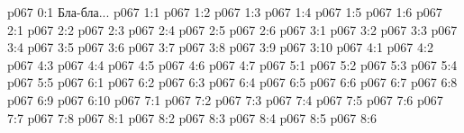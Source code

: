 \author{Мелхиседек}
\vs p067 0:1  Бла-бла...
\vs p067 1:1 
\vs p067 1:2 
\vs p067 1:3 
\vs p067 1:4 \pc 
\vs p067 1:5 
\vs p067 1:6 
\vs p067 2:1 
\vs p067 2:2 
\vs p067 2:3 \pc 
\vs p067 2:4 \pc 
\vs p067 2:5 
\vs p067 2:6 
\vs p067 3:1 
\vs p067 3:2 
\vs p067 3:3 
\vs p067 3:4 
\vs p067 3:5 
\vs p067 3:6 \pc 
\vs p067 3:7 
\vs p067 3:8 
\vs p067 3:9 
\vs p067 3:10 
\vs p067 4:1 
\vs p067 4:2 
\vs p067 4:3 
\vs p067 4:4 
\vs p067 4:5 
\vs p067 4:6 \pc 
\vs p067 4:7 
\vs p067 5:1 
\vs p067 5:2 
\vs p067 5:3 
\vs p067 5:4 \pc 
\vs p067 5:5 
\vs p067 6:1 
\vs p067 6:2 
\vs p067 6:3 
\vs p067 6:4 
\vs p067 6:5 \pc 
\vs p067 6:6 
\vs p067 6:7 
\vs p067 6:8 \pc 
\vs p067 6:9 \pc 
\vs p067 6:10 
\vs p067 7:1 
\vs p067 7:2 
\vs p067 7:3 
\vs p067 7:4 
\vs p067 7:5 
\vs p067 7:6 
\vs p067 7:7 
\vs p067 7:8 \pc 
{}
\vs p067 8:1 
\vs p067 8:2 
\vs p067 8:3 
\vs p067 8:4 
\vs p067 8:5 
\vsetoff
\vs p067 8:6 
\quizlink
